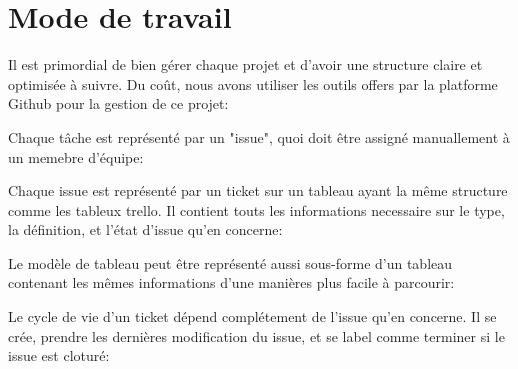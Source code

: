 \section{Mode de travail}

Il est primordial de bien gérer chaque projet et d'avoir une structure
claire et optimisée à suivre. Du coût, nous avons utiliser les outils
offers par la platforme Github pour la gestion de ce projet:

Chaque tâche est représenté par un "issue", quoi doit être assigné
manuallement à un memebre d'équipe:\\
\begin{figure}[H]
  \begin{center}
      \caption{}
  \end{center}
\end{figure}

Chaque issue est représenté par un ticket sur un tableau ayant la même
structure comme les tableux trello. Il contient touts les informations
necessaire sur le type, la définition, et l'état d'issue qu'en
concerne:\\
\begin{figure}[H]
  \begin{center}
      \caption{}
  \end{center}
\end{figure}

Le modèle de tableau peut être représenté aussi sous-forme d'un tableau
contenant les mêmes informations d'une manières plus facile à
parcourir:\\
\begin{figure}[H]
  \begin{center}
      \caption{}
  \end{center}
\end{figure}

Le cycle de vie d'un ticket dépend complétement de l'issue qu'en
concerne. Il se crée, prendre les dernières modification du issue, et
se label comme terminer si le issue est cloturé:\\
\begin{figure}[H]
  \begin{center}
      \caption{}
  \end{center}
\end{figure}


